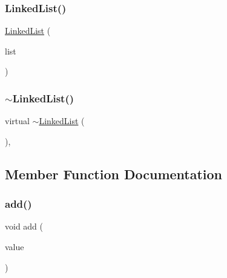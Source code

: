\mbox{\label{classLinkedList_ad6d043fd9b28b5547bfdded20547e07b}} 
\subsubsection{\texorpdfstring{Linked\+List()}{LinkedList()}\hspace{0.1cm}{\footnotesize\ttfamily [3/3]}}
{\footnotesize\ttfamily \mbox{\hyperlink{classLinkedList}{Linked\+List}} (\begin{DoxyParamCaption}\item[{std\+::initializer\+\_\+list$<$ Value\+Type $>$}]{list }\end{DoxyParamCaption})}

\mbox{\label{classLinkedList_a3112225e2c74b4df3327f36e6c34e861}} 
\subsubsection{\texorpdfstring{$\sim$\+Linked\+List()}{~LinkedList()}}
{\footnotesize\ttfamily virtual $\sim$\mbox{\hyperlink{classLinkedList}{Linked\+List}} (\begin{DoxyParamCaption}{ }\end{DoxyParamCaption})\hspace{0.3cm}{\ttfamily [virtual]}, {\ttfamily [default]}}



\subsection{Member Function Documentation}
\mbox{\label{classLinkedList_aa6249e9d60956ac91381e5040b77c0c6}} 
\subsubsection{\texorpdfstring{add()}{add()}}
{\footnotesize\ttfamily void add (\begin{DoxyParamCaption}\item[{Value\+Type}]{value }\end{DoxyParamCaption})}


